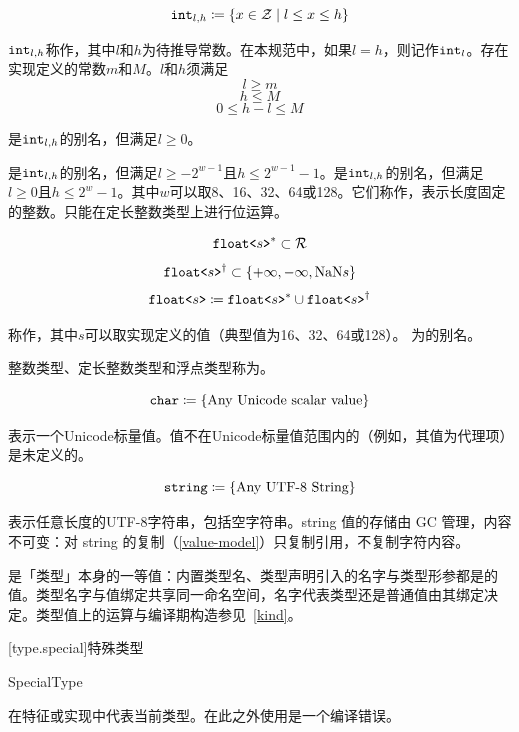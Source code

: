 $$\texttt{int}_{l,h} \coloneqq \{ x \in \mathcal{Z} \mid l \le x \le h \} $$

\pnum
$\texttt{int}_{l,h}$称作，其中$l$和$h$为待推导常数。在本规范中，如果$l = h$，则记作$\texttt{int}_l$。存在实现定义的常数$m$和$M$。$l$和$h$须满足
$$ l \ge m $$
$$ h \le M $$
$$ 0 \le h - l \le M $$

是$\texttt{int}_{l,h}$的别名，但满足$l\ge0$。

\pnum
{}是$\texttt{int}_{l,h}$的别名，但满足$l\ge-2^{w-1}$且$h\le2^{w-1}-1$。是$\texttt{int}_{l,h}$的别名，但满足$l\ge0$且$h\le2^w-1$。其中$w$可以取8、16、32、64或128。它们称作，表示长度固定的整数。只能在定长整数类型上进行位运算。

$$ \texttt{float<}s\texttt{>}^\ast \subset \mathcal{R} $$
$$ \texttt{float<}s\texttt{>}^\dagger \subset \{ +\infty, -\infty, \mathrm{NaN}s \} $$
$$ \texttt{float<}s\texttt{>} \coloneqq \texttt{float<}s\texttt{>}^\ast \cup \texttt{float<}s\texttt{>}^\dagger $$

\pnum
{}称作，其中$s$可以取实现定义的值（典型值为16、32、64或128）。
为的别名。

\pnum
整数类型、定长整数类型和浮点类型称为。

$$\texttt{char} \coloneqq \left\{ \textnormal{Any Unicode scalar value} \right\}$$

\pnum
{}表示一个Unicode标量值。值不在Unicode标量值范围内的（例如，其值为代理项）是未定义的。

$$\texttt{string} \coloneqq \left\{ \textnormal{Any UTF-8 String} \right\} $$

\pnum
{}表示任意长度的UTF-8字符串，包括空字符串。string 值的存储由 GC 管理，内容不可变：对 string 的复制（\ref{value-model}）只复制引用，不复制字符内容。

\pnum
{}是「类型」本身的一等值：内置类型名、类型声明引入的名字与类型形参都是的值。类型名字与值绑定共享同一命名空间，名字代表类型还是普通值由其绑定决定。类型值上的运算与编译期构造参见~\ref{kind}。

[type.special]{特殊类型}

\begin{bnf}{SpecialType}
\end{bnf}

\pnum
{}在特征或实现中代表当前类型。在此之外使用是一个编译错误。

